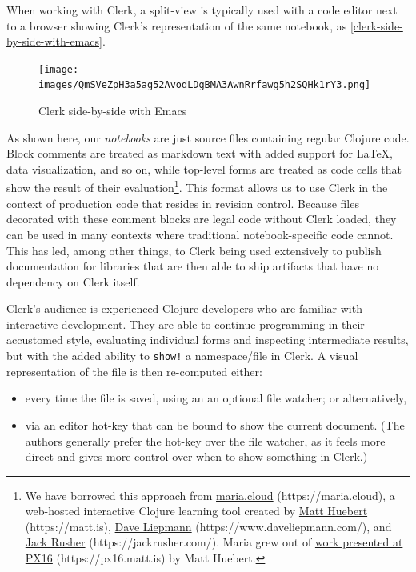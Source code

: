 \documentclass[sigconf,screen]{acmart}
\newcommand{\passthrough}[1]{#1}
\providecommand{\tightlist}{%
  \setlength{\itemsep}{0pt}\setlength{\parskip}{0pt}}
\begin{document}
When working with Clerk, a split-view is typically used with a code editor next to a browser showing Clerk's representation of the same notebook, as \autoref{clerk-side-by-side-with-emacs}.

\begin{figure}
\hypertarget{clerk-side-by-side-with-emacs}{%
\centering
\texttt{[image: images/QmSVeZpH3a5ag52AvodLDgBMA3AwnRrfawg5h2SQHk1rY3.png]}
\caption{Clerk side-by-side with Emacs}\label{clerk-side-by-side-with-emacs}
}
\end{figure}

As shown here, our \emph{notebooks} are just source files containing regular Clojure code. Block comments are treated as markdown text with added support for LaTeX, data visualization, and so on, while top-level forms are treated as code cells that show the result of their evaluation\footnote{We have borrowed this approach from {\href{https://maria.cloud}{maria.cloud} (https://maria.cloud)}, a web-hosted interactive Clojure learning tool created by {\href{https://matt.is}{Matt Huebert} (https://matt.is)}, {\href{https://www.daveliepmann.com/}{Dave Liepmann} (https://www.daveliepmann.com/)}, and {\href{https://jackrusher.com/}{Jack Rusher} (https://jackrusher.com/)}. Maria grew out of {\href{https://px16.matt.is}{work presented at PX16} (https://px16.matt.is)} by Matt Huebert.}. This format allows us to use Clerk in the context of production code that resides in revision control. Because files decorated with these comment blocks are legal code without Clerk loaded, they can be used in many contexts where traditional notebook-specific code cannot. This has led, among other things, to Clerk being used extensively to publish documentation for libraries that are then able to ship artifacts that have no dependency on Clerk itself.

Clerk's audience is experienced Clojure developers who are familiar with interactive development. They are able to continue programming in their accustomed style, evaluating individual forms and inspecting intermediate results, but with the added ability to \passthrough{\lstinline"show!"} a namespace/file in Clerk. A visual representation of the file is then re-computed either:

\begin{itemize}
\tightlist
\item
  every time the file is saved, using an an optional file watcher; or alternatively,
\item
  via an editor hot-key that can be bound to show the current document. (The authors generally prefer the hot-key over the file watcher, as it feels more direct and gives more control over when to show something in Clerk.)
\end{itemize}
\end{document}
